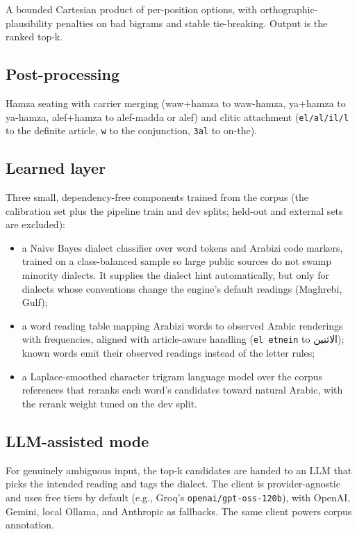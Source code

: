 \documentclass[11pt]{article}
\newcommand{\ar}[1]{{\arabicfont #1}}
\newcommand{\az}[1]{\texttt{#1}}
\begin{document}
A bounded Cartesian product of per-position options, with
orthographic-plausibility penalties on bad bigrams and stable
tie-breaking. Output is the ranked top-k.

\subsection{Post-processing}
\label{sec:post}

Hamza seating with carrier merging (waw+hamza to waw-hamza, ya+hamza to
ya-hamza, alef+hamza to alef-madda or alef) and clitic attachment
(\az{el/al/il/l} to the definite article, \az{w} to the conjunction,
\az{3al} to on-the).

\subsection{Learned layer}
\label{sec:learned}

Three small, dependency-free components trained from the corpus (the
calibration set plus the pipeline train and dev splits; held-out and
external sets are excluded):

\begin{itemize}
  \item a Naive Bayes dialect classifier over word tokens and Arabizi
        code markers, trained on a class-balanced sample so large public
        sources do not swamp minority dialects. It supplies the dialect
        hint automatically, but only for dialects whose conventions
        change the engine's default readings (Maghrebi, Gulf);
  \item a word reading table mapping Arabizi words to observed Arabic
        renderings with frequencies, aligned with article-aware handling
        (\az{el etnein} to \ar{الاثنين}); known words emit their
        observed readings instead of the letter rules;
  \item a Laplace-smoothed character trigram language model over the
        corpus references that reranks each word's candidates toward
        natural Arabic, with the rerank weight tuned on the dev split.
\end{itemize}

\subsection{LLM-assisted mode}
\label{sec:llm}

For genuinely ambiguous input, the top-k candidates are handed to an LLM
that picks the intended reading and tags the dialect. The client is
provider-agnostic and uses free tiers by default (e.g., Groq's
\az{openai/gpt-oss-120b}), with OpenAI, Gemini, local Ollama, and
Anthropic as fallbacks. The same client powers corpus annotation.
\end{document}
